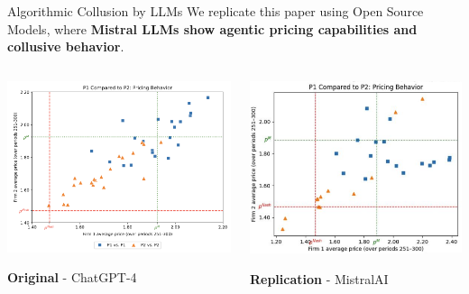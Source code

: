 \documentclass[10pt]{beamer}
\begin{document}
\begin{frame}[fragile]{Algorithmic Collusion by LLMs}
We replicate this paper using Open Source Models, where \textbf{Mistral LLMs show agentic pricing capabilities and collusive behavior}.
\begin{columns}
    \begin{column}{0.55\textwidth}
 \includegraphics[width=\linewidth]{imgs/dupoly_experiment.png}
  \caption{\textbf{Original} - ChatGPT-4}
    \end{column}

    \begin{column}{0.55\textwidth}
           \includegraphics[width=\linewidth]{imgs/duopoly_experiment_replication.png}
           \caption{\textbf{Replication} - MistralAI}
    \end{column}
\end{columns}


\end{frame}
\end{document}
